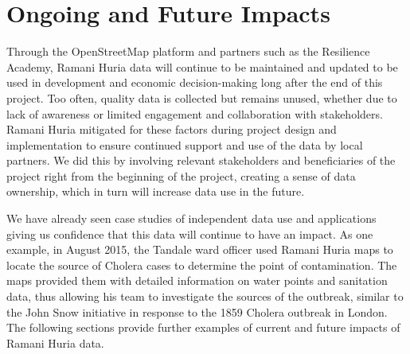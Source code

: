 \documentclass[a4paper,12pt,twoside]{article}
\begin{document}
\section{Ongoing and Future Impacts}
Through the OpenStreetMap platform and partners such as the Resilience Academy, Ramani Huria data will continue to be maintained and updated to be used in development and economic decision-making long after the end of this project. Too often, quality data is collected but remains unused, whether due to lack of awareness or limited engagement and collaboration with stakeholders. Ramani Huria mitigated for these factors during project design and implementation to ensure continued support and use of the data by local partners. We did this by involving relevant stakeholders and beneficiaries of the project right from the beginning of the project, creating a sense of data ownership, which in turn will increase data use in the future.

We have already seen case studies of independent data use and applications giving us confidence that this data will continue to have an impact. As one example, in August 2015, the Tandale ward officer used Ramani Huria maps to locate the source of Cholera cases to determine the point of contamination. The maps provided them with detailed information on water points and sanitation data, thus allowing his team to investigate the sources of the outbreak, similar to the John Snow initiative in response to the 1859 Cholera outbreak in London. The following sections provide further examples of current and future impacts of Ramani Huria data. 
\end{document}
